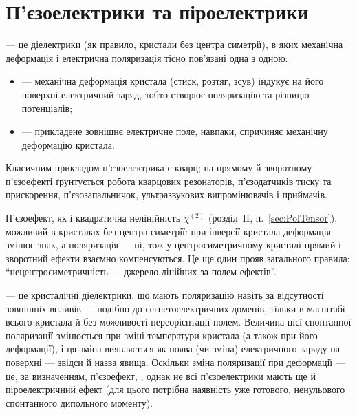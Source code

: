 \section{П'єзоелектрики та піроелектрики}\label{sec:PiezoPyro}

 --- це діелектрики (як правило, кристали без центра симетрії), в яких механічна деформація і електрична поляризація тісно
пов'язані одна з одною:
\begin{itemize}
	\item {} --- механічна деформація кристала (стиск, розтяг, зсув) індукує на його поверхні електричний заряд, тобто
	      створює поляризацію та різницю потенціалів;
	\item {} --- прикладене зовнішнє електричне поле, навпаки, спричиняє механічну деформацію кристала.
\end{itemize}
Класичним прикладом п'єзоелектрика є кварц; на прямому й зворотному п'єзоефекті ґрунтується робота кварцових резонаторів, п'єзодатчиків тиску та
прискорення, п'єзозапальничок, ультразвукових випромінювачів і приймачів.

\begin{Attention}
	П'єзоефект, як і квадратична нелінійність $\chi^{(2)}$ (розділ~II, п.~\ref{sec:PolTensor}), можливий  в кристалах без центра
	симетрії: при інверсії кристала деформація змінює знак, а поляризація --- ні, тож у центросиметричному кристалі прямий і зворотний ефекти
	взаємно компенсуються. Це ще один прояв загального правила: \enquote{нецентросиметричність --- джерело лінійних за полем ефектів}.
\end{Attention}

 --- це кристалічні діелектрики, що мають  поляризацію навіть за відсутності зовнішніх впливів --- подібно до
сегнетоелектричних доменів, тільки в масштабі всього кристала й без можливості переорієнтації полем. Величина цієї спонтанної поляризації
змінюється при зміні температури кристала (а також при його деформації), і ця зміна виявляється як поява (чи зміна) електричного заряду на
поверхні --- звідси й назва явища. Оскільки зміна поляризації при деформації --- це, за визначенням, п'єзоефект, , однак не всі п'єзоелектрики мають ще й піроелектричний ефект (для цього потрібна наявність уже готового, ненульового
спонтанного дипольного моменту).

